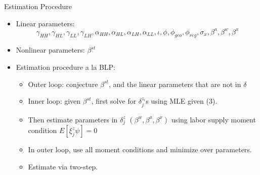 \documentclass{beamer}
\begin{document}
 \begin{frame}{Estimation Procedure}
 
\begin{itemize}
\item Linear parameters: 
$$\gamma_{HH}, \gamma_{HL}, \gamma_{LL}, \gamma_{LH}, \alpha_{HH}, \alpha_{HL}, \alpha_{LH}, \alpha_{LL},  \iota, \phi, \phi_{geo}, \phi_{reg}, \sigma_x, \beta^a, \beta^w, \beta^x $$

\item Nonlinear parameters: $\beta^{st}$

\item Estimation procedure a la BLP: 
\begin{itemize}
\item Outer loop: conjecture $\beta^{st}$, and the linear parameters that are not in $\delta$
\item Inner loop: given $\beta^{st}$, first solve for $\delta_j^{z_i}$s using MLE given (3). 
\item Then estimate parameters in $\delta_j^z$ $(\beta^w, \beta^a, \beta^x)$ using  labor supply moment condition $E[\xi_j^z \psi]=0$
\item In outer loop, use all moment conditions and minimize over parameters.
\item Estimate via two-step.

\end{itemize}
\end{itemize}
 \end{frame}
 
\end{document}
